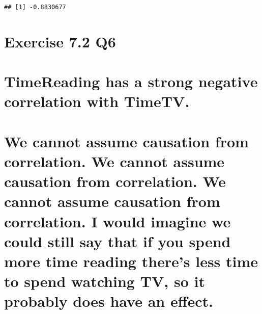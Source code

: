 \documentclass[
]{article}
\begin{document}
\begin{verbatim}
## [1] -0.8830677
\end{verbatim}

\section{Exercise 7.2 Q6}\label{exercise-7.2-q6}

\section{TimeReading has a strong negative correlation with
TimeTV.}\label{timereading-has-a-strong-negative-correlation-with-timetv.}

\section{We cannot assume causation from correlation. We cannot assume
causation from correlation. We cannot assume causation from correlation.
I would imagine we could still say that if you spend more time reading
there's less time to spend watching TV, so it probably does have an
effect.}\label{we-cannot-assume-causation-from-correlation.-we-cannot-assume-causation-from-correlation.-we-cannot-assume-causation-from-correlation.-i-would-imagine-we-could-still-say-that-if-you-spend-more-time-reading-theres-less-time-to-spend-watching-tv-so-it-probably-does-have-an-effect.}
\end{document}
